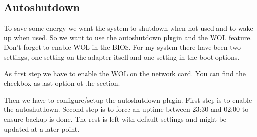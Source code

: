

\subsection{Autoshutdown}

To save some energy we want the system to shutdown when not used and to wake up
when used. So we want to use the autoshutdown plugin and the \gls{WOL} feature.
 Don't forget to enable \gls{WOL} in the BIOS. For my system
there have been two settings, one setting on the adapter itself and one setting
in the boot options.


As first step we have to enable the \gls{WOL} on the network card. You can find
the checkbox as last option ot the  section.


Then we have to configure/setup the autoshutdown plugin. First step is to
enable the autoshutdown. Second step is to force an uptime between 23:30 and
02:00 to ensure backup is done. The rest is left with default settings and
might be updated at a later point.



